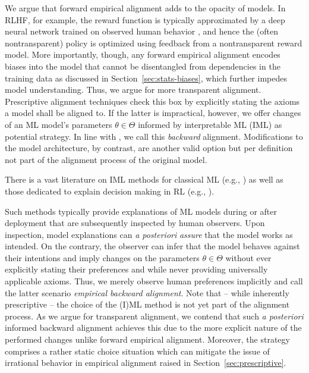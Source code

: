 \documentclass{article}
\theoremstyle{plain}
\theoremstyle{definition}
\theoremstyle{remark}
\begin{document}
We argue that forward empirical alignment adds to the opacity of models. In RLHF, for example, the reward function is typically approximated by a deep neural network trained on observed human behavior \cite{christiano2023deepreinforcementlearninghuman}, and hence the (often nontransparent) policy is optimized using feedback from a nontransparent reward model. More importantly, though, any forward empirical alignment encodes biases into the model that cannot be disentangled from dependencies in the training data as discussed in Section~\ref{sec:stats-biases}, which further impedes model understanding. Thus, we argue for more transparent alignment. Prescriptive alignment techniques check this box by explicitly stating the axioms a model shall be aligned to. If the latter is impractical, however, we offer changes of an ML model's parameters $\theta \in \Theta$ informed by interpretable ML (IML) as potential strategy. In line with \citet{ji2023ai}, we call this \textit{backward} alignment.  Modifications to the model architecture, by contrast, are another valid option but per definition not part of the alignment process of the original model.%

There is a vast literature on IML methods for classical ML (e.g., \citet{molnar2022,ribeiro2016LIME, SHAP_LundbergL17, greenwell2018pdp, covert20_sage}) as well as those dedicated to explain decision making in RL (e.g., \citet{XRL_survey_Piutta, XRL_survey_milani,madumal2023_causallens, topin_2019_apg, Olson_2021_counterfactual, RL_critical_states}).
%

Such methods typically provide explanations of ML models during or after deployment that are subsequently inspected by human observers. Upon inspection, model explanations can \textit{a posteriori} \textit{assure} that the model works as intended. On the contrary, the observer can infer that the model behaves against their intentions and imply changes on the parameters $\theta \in \Theta$ without ever explicitly stating their preferences and while never providing universally applicable axioms. Thus, we merely observe human preferences implicitly and call the latter scenario \textit{empirical backward alignment}. Note that -- while inherently prescriptive -- the choice of the (I)ML method is not yet part of the alignment process. As we argue for transparent alignment, we contend that such \textit{a posteriori} informed backward alignment achieves this due to the more explicit nature of the performed changes unlike forward empirical alignment. Moreover, the strategy comprises a rather static choice situation which can mitigate the issue of irrational behavior in empirical alignment raised in Section~\ref{sec:prescriptive}.
\end{document}
